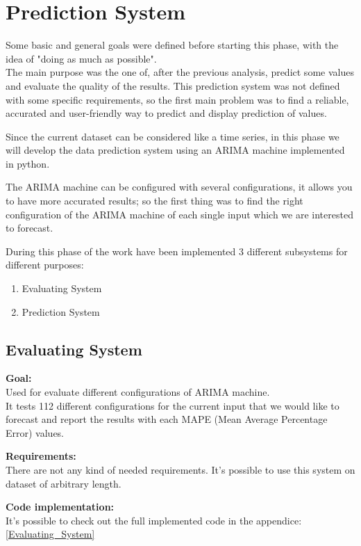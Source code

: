 
\chapter{Prediction System}

Some basic and general goals were defined before starting this phase, with the idea of "doing as much as possible". \\
The main purpose was the one of, after the previous analysis, predict some values and evaluate the quality of the results.
This prediction system was not defined with some specific requirements, so the first main problem was to find a reliable, accurated and user-friendly way to predict and display prediction of values.

Since the current dataset can be considered like a time series, in this phase we will develop the data prediction system using an ARIMA machine implemented in python.

The ARIMA machine can be configured with several configurations, it allows you to have more accurated results; so the first thing was to find the right configuration of the ARIMA machine of each single input which we are interested to forecast.

During this phase of the work have been implemented 3 different subsystems for different purposes:
\begin{enumerate}
\item Evaluating System
\item Prediction System
\end{enumerate}

\newpage
\section{Evaluating System}
\textbf{Goal:}\\ 
Used for evaluate different configurations of ARIMA machine. \\ It tests 112 different configurations for the current input that we would like to forecast and report the results with each MAPE (Mean Average Percentage Error) values.

\textbf{Requirements:}\\
There are not any kind of needed requirements. It's possible to use this system on dataset of arbitrary length.

\textbf{Code implementation:}\\
It's possible to check out the full implemented code in the appendice: \ref{Evaluating_System}

